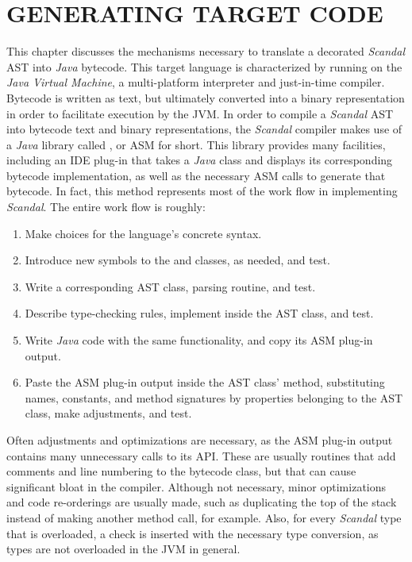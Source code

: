 \chapter{GENERATING TARGET CODE}

This chapter discusses the mechanisms necessary to translate a decorated \emph{Scandal} AST into \emph{Java} bytecode. This target language is characterized by running on the \emph{Java Virtual Machine}, a multi-platform interpreter and just-in-time compiler. Bytecode is written as text, but ultimately converted into a binary representation in order to facilitate execution by the JVM. In order to compile a \emph{Scandal} AST into bytecode text and binary representations, the \emph{Scandal} compiler makes use of a \emph{Java} library called , or ASM for short. This library provides many facilities, including an IDE plug-in that takes a \emph{Java} class and displays its corresponding bytecode implementation, as well as the necessary ASM calls to generate that bytecode. In fact, this method represents most of the work flow in implementing \emph{Scandal}. The entire work flow is roughly:

\begin{enumerate}
	\item Make choices for the language's concrete syntax.
	\item Introduce new symbols to the  and  classes, as needed, and test.
	\item Write a corresponding AST class, parsing routine, and test.
	\item Describe type-checking rules, implement  inside the AST class, and test.
	\item Write \emph{Java} code with the same functionality, and copy its ASM plug-in output.
	\item Paste the ASM plug-in output inside the AST class'  method, substituting names, constants, and method signatures by properties belonging to the AST class, make adjustments, and test.
\end{enumerate}

Often adjustments and optimizations are necessary, as the ASM plug-in output contains many unnecessary calls to its API. These are usually routines that add comments and line numbering to the bytecode class, but that can cause significant bloat in the compiler. Although not necessary, minor optimizations and code re-orderings are usually made, such as duplicating the top of the stack instead of making another method call, for example. Also, for every \emph{Scandal} type that is overloaded, a check is inserted with the necessary type conversion, as types are not overloaded in the JVM in general.


